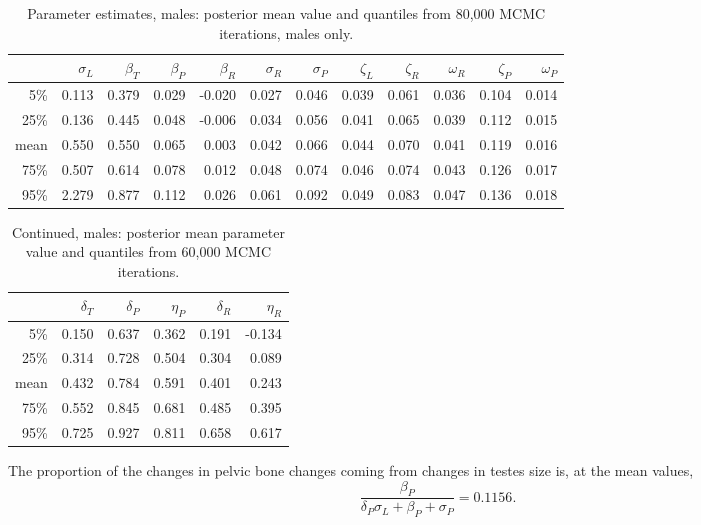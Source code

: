 \documentclass{article}
\begin{document}
\begin{table}[ht]
\centering
\begin{tabular}{rrrrrrrrrrrr}
  \hline
 & $\sigma_L$ & $\beta_T$ & $\beta_P$ & $\beta_R$ & $\sigma_R$ & $\sigma_P$ & $\zeta_L$ & $\zeta_R$ & $\omega_R$ & $\zeta_P$ & $\omega_P$ \\ 
  \hline
5\% & 0.113 & 0.379 & 0.029 & -0.020 & 0.027 & 0.046 & 0.039 & 0.061 & 0.036 & 0.104 & 0.014 \\ 
  25\% & 0.136 & 0.445 & 0.048 & -0.006 & 0.034 & 0.056 & 0.041 & 0.065 & 0.039 & 0.112 & 0.015 \\ 
  mean & 0.550 & 0.550 & 0.065 & 0.003 & 0.042 & 0.066 & 0.044 & 0.070 & 0.041 & 0.119 & 0.016 \\ 
  75\% & 0.507 & 0.614 & 0.078 & 0.012 & 0.048 & 0.074 & 0.046 & 0.074 & 0.043 & 0.126 & 0.017 \\ 
  95\% & 2.279 & 0.877 & 0.112 & 0.026 & 0.061 & 0.092 & 0.049 & 0.083 & 0.047 & 0.136 & 0.018 \\ 
   \hline
\end{tabular}
\caption{Parameter estimates, males: posterior mean value and quantiles from 80,000 MCMC iterations, males only.}
\end{table}



\begin{table}[ht]
\centering
\begin{tabular}{rrrrrr}
  \hline
 & $\delta_T$ & $\delta_P$ & $\eta_P$ & $\delta_R$ & $\eta_R$ \\ 
  \hline
5\% & 0.150 & 0.637 & 0.362 & 0.191 & -0.134 \\ 
  25\% & 0.314 & 0.728 & 0.504 & 0.304 & 0.089 \\ 
  mean & 0.432 & 0.784 & 0.591 & 0.401 & 0.243 \\ 
  75\% & 0.552 & 0.845 & 0.681 & 0.485 & 0.395 \\ 
  95\% & 0.725 & 0.927 & 0.811 & 0.658 & 0.617 \\ 
   \hline
\end{tabular}
\caption{Continued, males: posterior mean parameter value and quantiles from 60,000 MCMC iterations.}
\end{table}

The proportion of the changes in pelvic bone changes coming from changes in testes size is, at the mean values,
\[
\frac{\beta_P}{ \delta_P \sigma_L + \beta_P + \sigma_P } = 0.1156 .
\]
\end{document}
